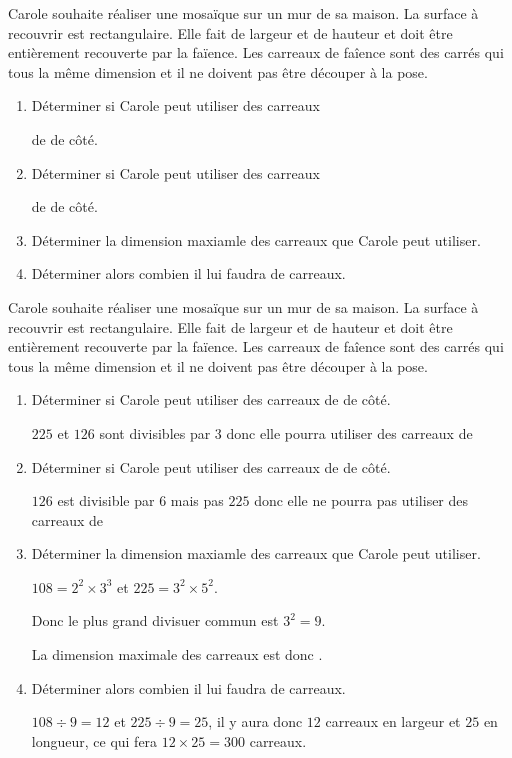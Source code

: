 \begin{exercice*}[Mosaïque]
    Carole souhaite réaliser une mosaïque sur un mur de sa maison. La surface à recouvrir est rectangulaire.
    Elle fait  de largeur et  de hauteur et doit être entièrement recouverte par la faïence.
    Les carreaux de faîence sont des carrés qui tous la même dimension et il ne doivent pas être découper à la pose.    
    \begin{enumerate}
        \item Déterminer si Carole peut utiliser des carreaux 
        
        de  de côté.
        \item Déterminer si Carole peut utiliser des carreaux 
        
        de  de côté.
        \item Déterminer la dimension maxiamle des carreaux que Carole peut utiliser.
        \item Déterminer alors combien il lui faudra de carreaux.
    \end{enumerate}
\end{exercice*}
\begin{corrige}
    Carole souhaite réaliser une mosaïque sur un mur de sa maison. La surface à recouvrir est rectangulaire.
    Elle fait  de largeur et  de hauteur et doit être entièrement recouverte par la faïence.
    Les carreaux de faîence sont des carrés qui tous la même dimension et il ne doivent pas être découper à la pose.

    \begin{enumerate}
        \item Déterminer si Carole peut utiliser des carreaux de  de côté.
        
        {\color{red} $225$ et $126$ sont divisibles par $3$ donc elle pourra utiliser des carreaux de }
        \item Déterminer si Carole peut utiliser des carreaux de  de côté.
        
        {\color{red} $126$ est divisible par $6$ mais pas $225$ donc elle ne pourra pas utiliser des carreaux de }
        \item Déterminer la dimension maxiamle des carreaux que Carole peut utiliser.
        
        {\color{red} $108 = 2^2\times 3^3$ et $225=3^2\times 5^2$.

        Donc le plus grand divisuer commun est $3^2=9$. 

        La dimension maximale des carreaux est donc .
        }
        \item Déterminer alors combien il lui faudra de carreaux.
        
        {\color{red} $108\div 9 = 12$ et $225\div 9 = 25$, il y aura donc $12$ carreaux en largeur et $25$ en longueur, ce qui fera $12\times 25 = 300$ carreaux.}
    \end{enumerate}
\end{corrige}

